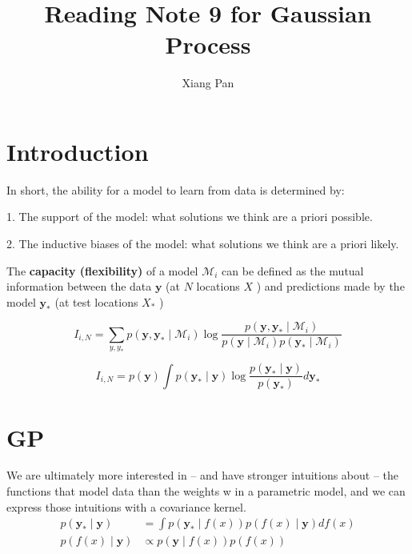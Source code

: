 \documentclass{article}
\title{Reading Note 9 for Gaussian Process}
\author{Xiang Pan}
\begin{document}
\maketitle
\section{Introduction}

In short, the ability for a model to learn from data is determined by:

1. The support of the model: what solutions we think are a priori possible.

2. The inductive biases of the model: what solutions we think are a priori likely.

The \textbf{capacity (flexibility)} of a model $\mathcal{M}_{i}$ can be defined as the mutual information between the data $\boldsymbol{y}$ (at $N$ locations $X$ ) and predictions made by the model $\boldsymbol{y}_{*}$ (at test locations $X_{*}$ )




\begin{equation}
I_{i, N}=\sum_{y, y_{*}} p\left(\boldsymbol{y}, \boldsymbol{y}_{*} \mid \mathcal{M}_{i}\right) \log \frac{p\left(\boldsymbol{y}, \boldsymbol{y}_{*} \mid \mathcal{M}_{i}\right)}{p\left(\boldsymbol{y} \mid \mathcal{M}_{i}\right) p\left(\boldsymbol{y}_{*} \mid \mathcal{M}_{i}\right)}
\end{equation}

\begin{equation}
    I_{i, N}=p(\boldsymbol{y}) \int p\left(\boldsymbol{y}_{*} \mid \boldsymbol{y}\right) \log \frac{p\left(\boldsymbol{y}_{*} \mid \boldsymbol{y}\right)}{p\left(\boldsymbol{y}_{*}\right)} d \boldsymbol{y}_{*}
\end{equation}

\section{GP}
We are ultimately more interested in – and have stronger intuitions about – the functions that model data than the weights w in a parametric model, and we can express those intuitions with a covariance kernel.
\begin{equation}
    \begin{aligned}
    p\left(\boldsymbol{y}_{*} \mid \boldsymbol{y}\right) &=\int p\left(\boldsymbol{y}_{*} \mid f(x)\right) p(f(x) \mid \boldsymbol{y}) d f(x) \\
    p(f(x) \mid \boldsymbol{y}) & \propto p(\boldsymbol{y} \mid f(x)) p(f(x))
    \end{aligned}
\end{equation}
\end{document}
